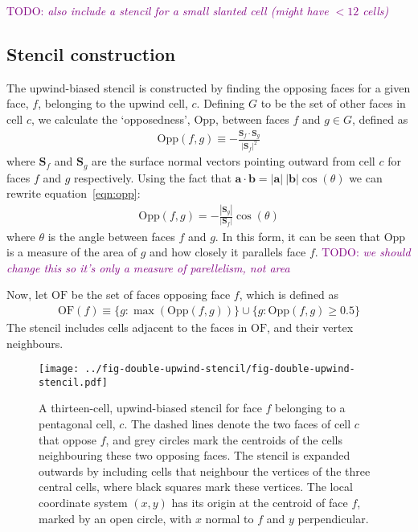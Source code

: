 \documentclass{article}
\newcommand{\TODO}[1]{\textcolor{purple}{TODO: \emph{#1}}}
\begin{document}
\TODO{also include a stencil for a small slanted cell (might have $< 12$ cells)}

\subsection{Stencil construction}
The upwind-biased stencil is constructed by finding the opposing faces for a given face, $f$, belonging to the upwind cell, $c$.  Defining $G$ to be the set of other faces in cell $c$, we calculate the `opposedness', $\mathrm{Opp}$, between faces $f$ and $g \in G$, defined as
\begin{align}
	\mathrm{Opp}(f, g) \equiv - \frac{\mathbf{S}_f \cdot \mathbf{S}_g}{|\mathbf{S}_f|^2} \label{eqn:opp}
\end{align}
where $\mathbf{S}_f$ and $\mathbf{S}_g$ are the surface normal vectors pointing outward from cell $c$ for faces $f$ and $g$ respectively.
Using the fact that $\mathbf{a} \cdot \mathbf{b} = |\mathbf{a}|\:|\mathbf{b}| \cos(\theta)$ we can rewrite equation~\ref{eqn:opp}:
\begin{align}
	\mathrm{Opp}(f, g) = - \frac{|\mathbf{S}_g|}{|\mathbf{S}_f|} \cos(\theta)
\end{align}
where $\theta$ is the angle between faces $f$ and $g$.  In this form, it can be seen that $\mathrm{Opp}$ is a measure of the area of $g$ and how closely it parallels face $f$. \TODO{we should change this so it's only a measure of parellelism, not area}

Now, let $\mathrm{OF}$ be the set of faces opposing face $f$, which is defined as
\begin{align}
	\mathrm{OF}(f) \equiv \{ g : \max(\mathrm{Opp}(f, g)) \} \cup \{ g : \mathrm{Opp}(f, g) \geq 0.5 \}
\end{align}
The stencil includes cells adjacent to the faces in $\mathrm{OF}$, and their vertex neighbours.

\begin{figure}
	\centering
	\texttt{[image: ../fig-double-upwind-stencil/fig-double-upwind-stencil.pdf]}
	\caption{A thirteen-cell, upwind-biased stencil for face $f$ belonging to a pentagonal cell, $c$.  The dashed lines denote the two faces of cell $c$ that oppose $f$, and grey circles mark the centroids of the cells neighbouring these two opposing faces.  The stencil is expanded outwards by including cells that neighbour the vertices of the three central cells, where black squares mark these vertices.  The local coordinate system $(x, y)$ has its origin at the centroid of face $f$, marked by an open circle, with $x$ normal to $f$ and $y$ perpendicular.}
	\label{fig:double-upwind-stencil}
\end{figure}
\end{document}
